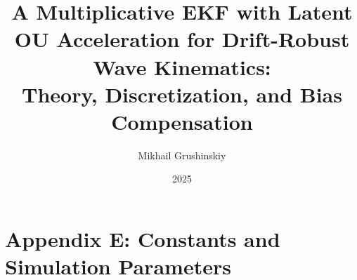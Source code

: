 \documentclass[10pt]{extarticle}
\title{A Multiplicative EKF with Latent OU Acceleration for Drift-Robust Wave Kinematics:\\
Theory, Discretization, and Bias Compensation}
\author{Mikhail Grushinskiy}
\date{2025}
\begin{document}
\maketitle



\tableofcontents















\section{Appendix E: Constants and Simulation Parameters}
\label{app:constants}



\end{document}
